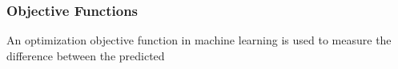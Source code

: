 \subsubsection{Objective Functions}
An optimization objective function in machine learning is used to measure the difference between the predicted